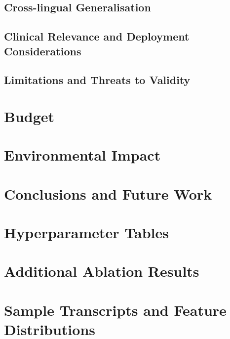 \documentclass[a4paper,12pt]{article}
\begin{document}
\subsection{Cross-lingual Generalisation}

\subsection{Clinical Relevance and Deployment Considerations}

\subsection{Limitations and Threats to Validity}

\clearpage
\section{Budget}

\clearpage
\section{Environmental Impact}

\clearpage
\section{Conclusions and Future Work}

\newpage
\medskip



\clearpage
\newpage

\begin{appendices}

\section{Hyperparameter Tables}

\section{Additional Ablation Results}

\section{Sample Transcripts and Feature Distributions}

\end{appendices}
\end{document}
